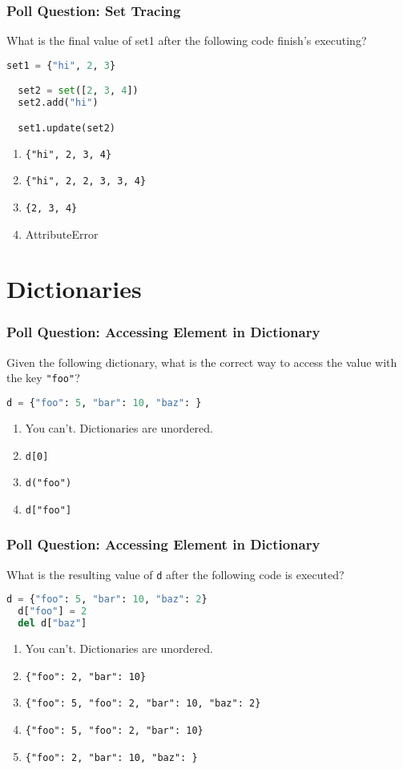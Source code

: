 \documentclass{beamer}
\begin{document}
%
%
\begin{frame}[fragile]
  \frametitle{Poll Question: Set Tracing}
  What is the final value of set1 after the following code finish's executing?
  \begin{lstlisting}[language=Python, autogobble]
  set1 = {"hi", 2, 3}

  set2 = set([2, 3, 4])
  set2.add("hi")

  set1.update(set2)
  \end{lstlisting}
  \vfill
  \begin{enumerate}[A] 
    \item \lstinline|{"hi", 2, 3, 4}| %
    \item \lstinline|{"hi", 2, 2, 3, 3, 4}|
    \item \lstinline|{2, 3, 4}|
    \item AttributeError
  \end{enumerate}
\end{frame}


\section{Dictionaries}

%
%
\begin{frame}[fragile]
  \frametitle{Poll Question: Accessing Element in Dictionary}
  Given the following dictionary, what is the correct way to access the value with the key \lstinline|"foo"|?
  \begin{lstlisting}[language=Python, autogobble]
  d = {"foo": 5, "bar": 10, "baz": }
  \end{lstlisting}
  \vfill
  \begin{enumerate}[A] 
    \item You can't. Dictionaries are unordered.
    \item \lstinline|d[0]|
    \item \lstinline|d("foo")|
    \item \lstinline|d["foo"]| %
  \end{enumerate}
\end{frame}


%
%
\begin{frame}[fragile]
  \frametitle{Poll Question: Accessing Element in Dictionary}
  What is the resulting value of \lstinline|d| after the following code is executed?
  \begin{lstlisting}[language=Python, autogobble]
  d = {"foo": 5, "bar": 10, "baz": 2}
  d["foo"] = 2
  del d["baz"] 
  \end{lstlisting}
  \vfill
  \begin{enumerate}[A] 
    \item You can't. Dictionaries are unordered.
    \item \lstinline|{"foo": 2, "bar": 10}|  %
    \item \lstinline|{"foo": 5, "foo": 2, "bar": 10, "baz": 2}|
    \item \lstinline|{"foo": 5, "foo": 2, "bar": 10}|
    \item \lstinline|{"foo": 2, "bar": 10, "baz": }|
  \end{enumerate}
\end{frame}
\end{document}
